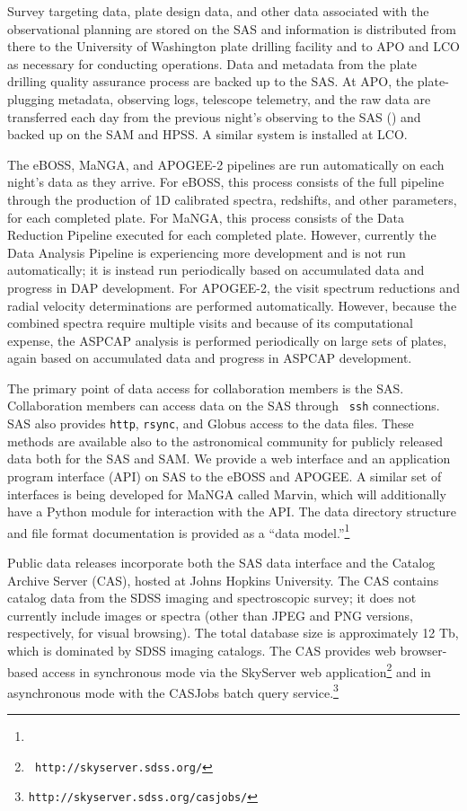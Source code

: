 Survey targeting data, plate design data, and other data associated
with the observational planning are stored on the SAS and information
is distributed from there to the University of Washington plate
drilling facility and to APO and LCO as necessary for conducting
operations. Data and metadata from the plate drilling quality
assurance process are backed up to the SAS. At APO, the plate-plugging
metadata, observing logs, telescope telemetry, and the raw data are
transferred each day from the previous night's observing to the SAS
(\citealt{weaver15a}) and backed up on the SAM and HPSS. A similar
system is installed at LCO.

The eBOSS, MaNGA, and APOGEE-2 pipelines are run automatically on each
night's data as they arrive. For eBOSS, this process consists of the
full pipeline through the production of 1D calibrated spectra,
redshifts, and other parameters, for each completed plate. For MaNGA,
this process consists of the Data Reduction Pipeline executed for each
completed plate. However, currently the Data Analysis Pipeline is
experiencing more development and is not run automatically; it is
instead run periodically based on accumulated data and progress in DAP
development. For APOGEE-2, the visit spectrum reductions and radial
velocity determinations are performed automatically.  However, because
the combined spectra require multiple visits and because of its
computational expense, the ASPCAP analysis is performed periodically
on large sets of plates, again based on accumulated data and progress
in ASPCAP development.

The primary point of data access for collaboration members is the
SAS. Collaboration members can access data on the SAS through {\tt
ssh} connections. SAS also provides {\tt http}, {\tt rsync}, and
Globus access to the data files. These methods are available also to
the astronomical community for publicly released data both for the SAS
and SAM. We provide a web interface and an application program
interface (API) on SAS to the eBOSS and APOGEE. A similar set of
interfaces is being developed for MaNGA called Marvin, which will
additionally have a Python module for interaction with the API. The
data directory structure and file format documentation is provided as
a ``data model.''\footnote{}

Public data releases incorporate both the SAS data interface and the
Catalog Archive Server (CAS), hosted at Johns Hopkins University. The
CAS contains catalog data from the SDSS imaging and spectroscopic
survey; it does not currently include images or spectra (other than
JPEG and PNG versions, respectively, for visual browsing). The total
database size is approximately 12 Tb, which is dominated by SDSS
imaging catalogs. The CAS provides web browser-based access in
synchronous mode via the SkyServer web application\footnote{\tt
http://skyserver.sdss.org/} and in asynchronous mode with the CASJobs
batch query service.\footnote{\tt http://skyserver.sdss.org/casjobs/}

